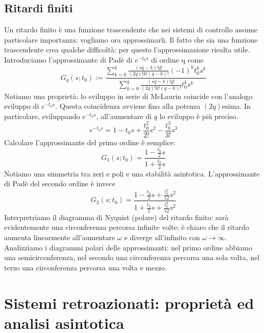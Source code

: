 \documentclass[11pt]{article}
\begin{document}
\subsection{Ritardi finiti}
Un ritardo finito è una funzione trascendente che nei sistemi di controllo assume particolare importanza: vogliamo ora approssimarli. Il fatto che sia una funzione trascendente crea qualche difficoltà: per questo l'approssimazione risulta utile. Introduciamo l'approssimante di Padè di $e^{-t_0s}$ di ordine q come 
\begin{displaymath}
    G_q(s;t_0) := \frac{\sum_{k=0}^q \frac{(sq-k)!q!}{(2q)!k!(q-k)!}(-1)^k t^k_0 s^k}{\sum_{k=0}^q \frac{(sq-k)!q!}{(2q)!k!(q-k)!} t^k_0 s^k}
\end{displaymath}
Notiamo una proprietà: lo sviluppo in serie di McLaurin coincide con l'analogo sviluppo di $e^{-t_0s}$. Questa coincidenza avviene fino alla potenza $(2q)$esima. In particolare, sviluppando $e^{-t_0s}$, all'aumentare di $q$ lo sviluppo è più preciso.
\begin{displaymath}
    e^{-t_0s} = 1- t_0s + \frac{t_0^2}{2!}s^2-\frac{t_0^3}{3!}s^3
\end{displaymath}
Calcolare l'approssimante del primo ordine è semplice: 
\begin{displaymath}
    G_1(s;t_0) = \frac{1-\frac{t_0}{2}s}{1+\frac{t_0}{2}s}
\end{displaymath}
Notiamo una simmetria tra zeri e poli e una stabilità asintotica.
L'approssimante di Padè del secondo ordine è invece 
\begin{displaymath}
    G_2(s;t_0) = \frac{1-\frac{t_0}{2}s + \frac{t_0^2}{12}s^2}{1+\frac{t_0}{2}s + \frac{t_0^2}{12}s^2}
\end{displaymath}
Interpretriamo il diagramma di Nyquist (polare) del ritardo finito: sarà evidentemente una circonferenza percorsa infinite volte: è chiaro che il ritardo aumenta linearmente all'aumentare $\omega$ e diverge all'infinito con $\omega\rightarrow\infty$. Analizziamo i diagrammi polari delle approssimanti: nel primo ordine abbiamo una semicirconferenza, nel secondo una circonferenza percorsa una sola volta, nel terzo una circonferenza percorsa una volta e mezzo.
\section{Sistemi retroazionati: proprietà ed analisi asintotica}
\end{document}
